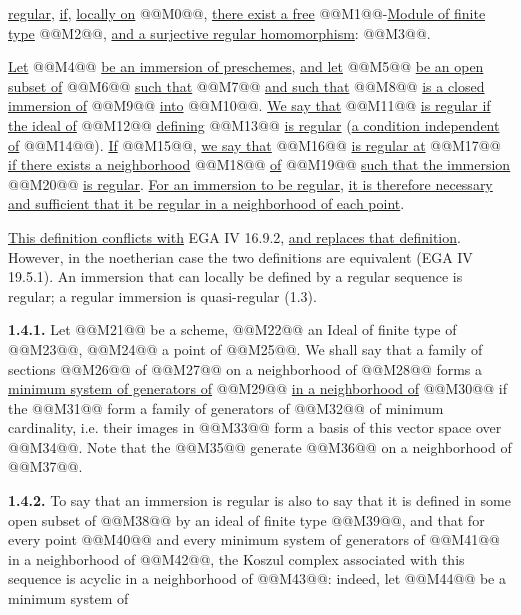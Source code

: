 \uline{regular}, \uline{if}, \uline{locally on} @@M0@@, \uline{there exist a free} @@M1@@-\uline{Module of finite type} @@M2@@, \uline{and a surjective regular homomorphism}: @@M3@@.

\uline{Let} @@M4@@ \uline{be an immersion of preschemes}, \uline{and let} @@M5@@ \uline{be an open subset of} @@M6@@ \uline{such that} @@M7@@ \uline{and such that} @@M8@@ \uline{is a closed immersion of} @@M9@@ \uline{into} @@M10@@. \uline{We say that} @@M11@@ \uline{is regular if the ideal of} @@M12@@ \uline{defining} @@M13@@ \uline{is regular} (\uline{a condition independent of} @@M14@@). \uline{If} @@M15@@, \uline{we say that} @@M16@@ \uline{is regular at} @@M17@@ \uline{if there exists a neighborhood} @@M18@@ \uline{of} @@M19@@ \uline{such that the immersion} @@M20@@ \uline{is regular}. \uline{For an immersion to be regular}, \uline{it is therefore necessary and sufficient that it be regular in a neighborhood of each point}.

\uline{This definition conflicts with} EGA IV 16.9.2, \uline{and replaces that definition}. However, in the noetherian case the two definitions are equivalent (EGA IV 19.5.1). An immersion that can locally be defined by a regular sequence is regular; a regular immersion is quasi-regular (1.3).

\textbf{1.4.1.} Let @@M21@@ be a scheme, @@M22@@ an Ideal of finite type of @@M23@@, @@M24@@ a point of @@M25@@. We shall say that a family of sections @@M26@@ of @@M27@@ on a neighborhood of @@M28@@ forms a \uline{minimum system of generators of} @@M29@@ \uline{in a neighborhood of} @@M30@@ if the @@M31@@ form a family of generators of @@M32@@ of minimum cardinality, i.e. their images in @@M33@@ form a basis of this vector space over @@M34@@. Note that the @@M35@@ generate @@M36@@ on a neighborhood of @@M37@@.

\textbf{1.4.2.} To say that an immersion is regular is also to say that it is defined in some open subset of @@M38@@ by an ideal of finite type @@M39@@, and that for every point @@M40@@ and every minimum system of generators of @@M41@@ in a neighborhood of @@M42@@, the Koszul complex associated with this sequence is acyclic in a neighborhood of @@M43@@: indeed, let @@M44@@ be a minimum system of
